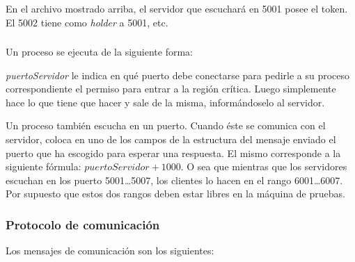 En el archivo mostrado arriba, el servidor que escuchará en 5001 posee el token.
El 5002 tiene como \emph{holder} a 5001, etc.


\subsubsection{}

Un proceso  se ejecuta de la siguiente forma:


\emph{puertoServidor} le indica en qué puerto debe conectarse para pedirle a su
proceso  correspondiente el permiso para entrar a la región
crítica. Luego simplemente hace lo que tiene que hacer y sale de la misma,
informándoselo al servidor.

Un proceso  también escucha en un puerto. Cuando éste se
comunica con el servidor, coloca en uno de los campos de la estructura del
mensaje enviado el puerto que ha escogido para esperar una respuesta. El
mismo corresponde a la siguiente fórmula: $puertoServidor + 1000$. O sea que
mientras que los servidores escuchan en los puerto 5001\ldots5007, los clientes
lo hacen en el rango 6001\ldots6007. Por supuesto que estos dos rangos deben
estar libres en la máquina de pruebas.


\subsubsection{Protocolo de comunicación}

Los mensajes de comunicación son los siguientes:


